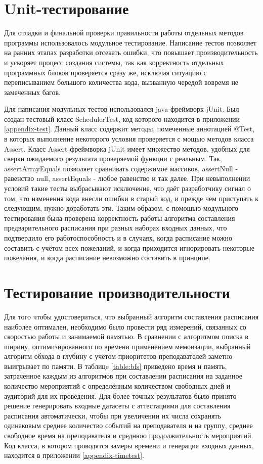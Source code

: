 \section{Unit-тестирование} \label{ch4:sec2}

Для отладки и финальной проверки правильности работы отдельных методов программы использовалось модульное тестирование. Написание тестов позволяет на ранних этапах разработки отсекать ошибки, что повышает производительность и ускоряет процесс создания системы, так как корректность отдельных программных блоков проверяется сразу же, исключая ситуацию с переписыванием большого количества кода, вызванную чередой вовремя не замеченных багов.

Для написания модульных тестов использовался java-фреймворк jUnit. Был создан тестовый класс SchedulerTest, код которого находится в приложении \ref{appendix-test}. Данный класс содержит методы, помеченные аннотацией @Test, в которых выполнение некоторого условия проверяется с мощью методов класса Assert. Класс Assert фреймворка jUnit имеет множество методов, удобных для сверки ожидаемого результата проверяемой функции с реальным. Так, assertArrayEquals позволяет сравнивать содержимое массивов, assertNull - равенство null, assertEquals - любое равенство и так далее. При невыполнении условий такие тесты выбрасывают исключение, что даёт разработчику сигнал о том, что изменения кода внесли ошибки в старый код, и прежде чем приступать к следующим, нужно доработать эти. Таким образом, с помощью модульного тестирования была проверена корректность работы алгоритма составления предварительного расписания при разных наборах входных данных, что подтвердило его работоспособность и в случаях, когда расписание можно составить с учётом всех пожеланий, и когда приходится игнорировать некоторые пожелания, и когда расписание невозможно составить в принципе. 

\section{Тестирование производительности} \label{ch4:sec3}
Для того чтобы удостовериться, что выбранный алгоритм составления расписания наиболее оптимален, необходимо было провести ряд измерений, связанных со скоростью работы и занимаемой памятью. В сравнении с алгоритмом поиска в ширину, оптимизированного по времени применением мемоизации, выбранный алгоритм обхода в глубину с учётом приоритетов преподавателей заметно выигрывает по памяти. В таблицe \ref{table:bfs} приведено время и память, затраченное каждым из алгоритмов при составлении расписания на заданное количество мероприятий с определённым количеством свободных дней и аудиторий для их проведения. Для более точных результатов было принято решение генерировать входные датасеты с аттестациями для составления расписания автоматически, чтобы при увеличении их числа сохранять одинаковым среднее количество событий на преподавателя и на группу, среднее свободное время на преподавателя и среднюю продолжительность мероприятий. Код класса, в котором проводятся замеры времени и генерация входных данных, находится в приложении \ref{appendix-timetest}.

